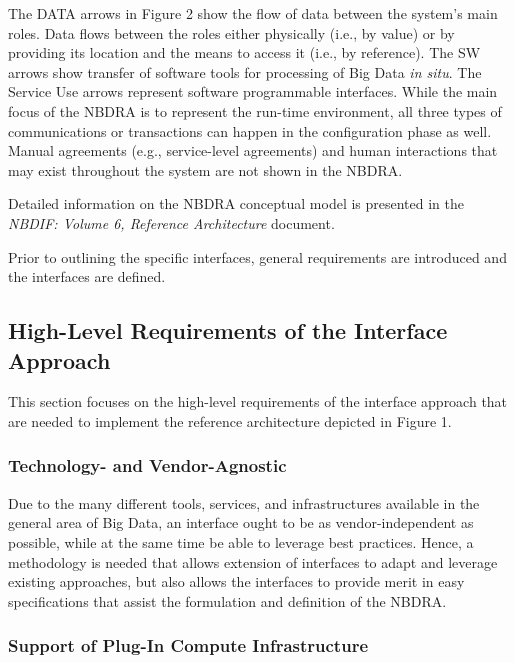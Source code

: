 \documentclass[9pt,]{article}
\begin{document}
The DATA arrows in Figure 2 show the flow of data between the system's
main roles. Data flows between the roles either physically (i.e., by
value) or by providing its location and the means to access it (i.e., by
reference). The SW arrows show transfer of software tools for processing
of Big Data \emph{in situ}. The Service Use arrows represent software
programmable interfaces. While the main focus of the NBDRA is to
represent the run-time environment, all three types of communications or
transactions can happen in the configuration phase as well. Manual
agreements (e.g., service-level agreements) and human interactions that
may exist throughout the system are not shown in the NBDRA.

Detailed information on the NBDRA conceptual model is presented in the
\emph{NBDIF: Volume 6, Reference Architecture} document.

Prior to outlining the specific interfaces, general requirements are
introduced and the interfaces are defined.

\hypertarget{high-level-requirements-of-the-interface-approach}{%
\subsection{High-Level Requirements of the Interface
Approach}\label{high-level-requirements-of-the-interface-approach}}

This section focuses on the high-level requirements of the interface
approach that are needed to implement the reference architecture
depicted in Figure 1.

\hypertarget{technology--and-vendor-agnostic}{%
\subsubsection{Technology- and
Vendor-Agnostic}\label{technology--and-vendor-agnostic}}

Due to the many different tools, services, and infrastructures available
in the general area of Big Data, an interface ought to be as
vendor-independent as possible, while at the same time be able to
leverage best practices. Hence, a methodology is needed that allows
extension of interfaces to adapt and leverage existing approaches, but
also allows the interfaces to provide merit in easy specifications that
assist the formulation and definition of the NBDRA.

\hypertarget{support-of-plug-in-compute-infrastructure}{%
\subsubsection{Support of Plug-In Compute
Infrastructure}\label{support-of-plug-in-compute-infrastructure}}
\end{document}
